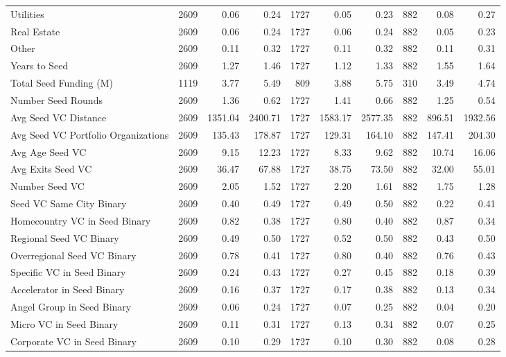 {\begin{table}[!h]
{\begin{tabular}[t]{lrrrrrrrrr}
Utilities & 2609 & 0.06 & 0.24 & 1727 & 0.05 & 0.23 & 882 & 0.08 & 0.27\\
Real Estate & 2609 & 0.06 & 0.24 & 1727 & 0.06 & 0.24 & 882 & 0.05 & 0.23\\
Other & 2609 & 0.11 & 0.32 & 1727 & 0.11 & 0.32 & 882 & 0.11 & 0.31\\
Years to Seed & 2609 & 1.27 & 1.46 & 1727 & 1.12 & 1.33 & 882 & 1.55 & 1.64\\
\addlinespace
Total Seed Funding (M) & 1119 & 3.77 & 5.49 & 809 & 3.88 & 5.75 & 310 & 3.49 & 4.74\\
Number Seed Rounds & 2609 & 1.36 & 0.62 & 1727 & 1.41 & 0.66 & 882 & 1.25 & 0.54\\
Avg Seed VC Distance & 2609 & 1351.04 & 2400.71 & 1727 & 1583.17 & 2577.35 & 882 & 896.51 & 1932.56\\
Avg Seed VC Portfolio Organizations & 2609 & 135.43 & 178.87 & 1727 & 129.31 & 164.10 & 882 & 147.41 & 204.30\\
Avg Age Seed VC & 2609 & 9.15 & 12.23 & 1727 & 8.33 & 9.62 & 882 & 10.74 & 16.06\\
\addlinespace
Avg Exits Seed VC & 2609 & 36.47 & 67.88 & 1727 & 38.75 & 73.50 & 882 & 32.00 & 55.01\\
Number Seed VC & 2609 & 2.05 & 1.52 & 1727 & 2.20 & 1.61 & 882 & 1.75 & 1.28\\
Seed VC Same City Binary & 2609 & 0.40 & 0.49 & 1727 & 0.49 & 0.50 & 882 & 0.22 & 0.41\\
Homecountry VC in Seed Binary & 2609 & 0.82 & 0.38 & 1727 & 0.80 & 0.40 & 882 & 0.87 & 0.34\\
Regional Seed VC Binary & 2609 & 0.49 & 0.50 & 1727 & 0.52 & 0.50 & 882 & 0.43 & 0.50\\
\addlinespace
Overregional Seed VC Binary & 2609 & 0.78 & 0.41 & 1727 & 0.80 & 0.40 & 882 & 0.76 & 0.43\\
Specific VC in Seed Binary & 2609 & 0.24 & 0.43 & 1727 & 0.27 & 0.45 & 882 & 0.18 & 0.39\\
Accelerator in Seed Binary & 2609 & 0.16 & 0.37 & 1727 & 0.17 & 0.38 & 882 & 0.13 & 0.34\\
Angel Group in Seed Binary & 2609 & 0.06 & 0.24 & 1727 & 0.07 & 0.25 & 882 & 0.04 & 0.20\\
Micro VC in Seed Binary & 2609 & 0.11 & 0.31 & 1727 & 0.13 & 0.34 & 882 & 0.07 & 0.25\\
\addlinespace
Corporate VC in Seed Binary & 2609 & 0.10 & 0.29 & 1727 & 0.10 & 0.30 & 882 & 0.08 & 0.28\\

\end{tabular}}
\end{table}}
